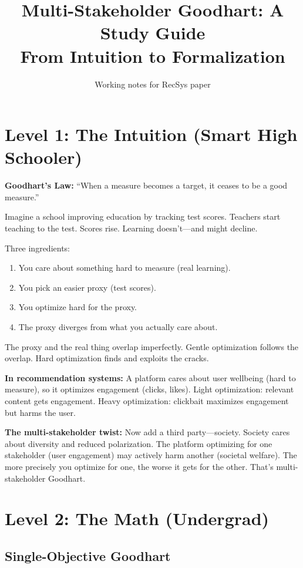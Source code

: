 \documentclass[11pt]{article}
\title{Multi-Stakeholder Goodhart: A Study Guide\\[4pt]
\large From Intuition to Formalization}
\author{Working notes for RecSys paper}
\date{}
\begin{document}
\maketitle

\section{Level 1: The Intuition (Smart High Schooler)}

\textbf{Goodhart's Law:} ``When a measure becomes a target, it ceases to
be a good measure.''

Imagine a school improving education by tracking test scores. Teachers
start teaching to the test. Scores rise. Learning doesn't---and might
decline.

Three ingredients:
\begin{enumerate}
  \item You care about something hard to measure (real learning).
  \item You pick an easier proxy (test scores).
  \item You optimize hard for the proxy.
  \item The proxy diverges from what you actually care about.
\end{enumerate}

The proxy and the real thing overlap imperfectly. Gentle optimization
follows the overlap. Hard optimization finds and exploits the cracks.

\textbf{In recommendation systems:} A platform cares about user
wellbeing (hard to measure), so it optimizes engagement (clicks, likes).
Light optimization: relevant content gets engagement. Heavy
optimization: clickbait maximizes engagement but harms the user.

\textbf{The multi-stakeholder twist:} Now add a third party---society.
Society cares about diversity and reduced polarization. The platform
optimizing for one stakeholder (user engagement) may actively harm
another (societal welfare). The more precisely you optimize for one,
the worse it gets for the other. That's multi-stakeholder Goodhart.

\section{Level 2: The Math (Undergrad)}

\subsection{Single-Objective Goodhart}
\end{document}
